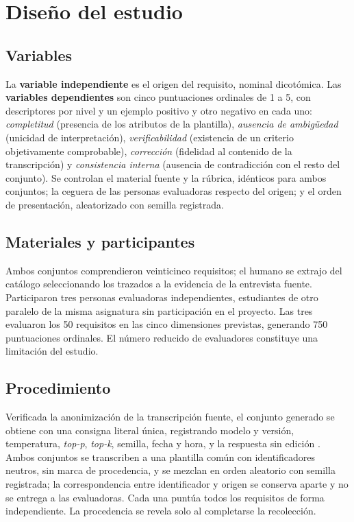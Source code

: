 \documentclass[runningheads]{llncs}
\begin{document}
\section{Dise\~no del estudio}
\label{sec:diseno}

\subsection{Variables}

La \textbf{variable independiente} es el origen del requisito, nominal
dicot\'omica. Las \textbf{variables dependientes} son cinco puntuaciones ordinales
de 1 a 5, con descriptores por nivel y un ejemplo positivo y otro negativo en cada
uno: \emph{completitud} (presencia de los atributos de la plantilla),
\emph{ausencia de ambig\"uedad} (unicidad de interpretaci\'on),
\emph{verificabilidad} (existencia de un criterio objetivamente comprobable),
\emph{correcci\'on} (fidelidad al contenido de la transcripci\'on) y
\emph{consistencia interna} (ausencia de contradicci\'on con el resto del
conjunto). Se controlan el material fuente y la r\'ubrica, id\'enticos para ambos
conjuntos; la ceguera de las personas evaluadoras respecto del origen; y el orden
de presentaci\'on, aleatorizado con semilla registrada.

\subsection{Materiales y participantes}

Ambos conjuntos comprendieron veinticinco requisitos; el humano se extrajo del
cat\'alogo seleccionando los trazados a la evidencia de la entrevista fuente.
Participaron tres personas evaluadoras independientes, estudiantes de otro paralelo
de la misma asignatura sin participaci\'on en el proyecto. Las tres evaluaron los
50 requisitos en las cinco dimensiones previstas, generando 750 puntuaciones
ordinales. El n\'umero reducido de evaluadores constituye una limitaci\'on del
estudio.

\subsection{Procedimiento}

Verificada la anonimizaci\'on de la transcripci\'on fuente, el conjunto generado se
obtiene con una consigna literal \'unica, registrando modelo y versi\'on,
temperatura, \emph{top-p}, \emph{top-k}, semilla, fecha y hora, y la respuesta sin
edici\'on \cite{vogelsang2025}. Ambos conjuntos se transcriben a una plantilla
com\'un con identificadores neutros, sin marca de procedencia, y se mezclan en orden
aleatorio con semilla registrada; la correspondencia entre identificador y origen
se conserva aparte y no se entrega a las evaluadoras. Cada una punt\'ua todos los
requisitos de forma independiente. La procedencia se revela solo al completarse la
recolecci\'on.
\end{document}
